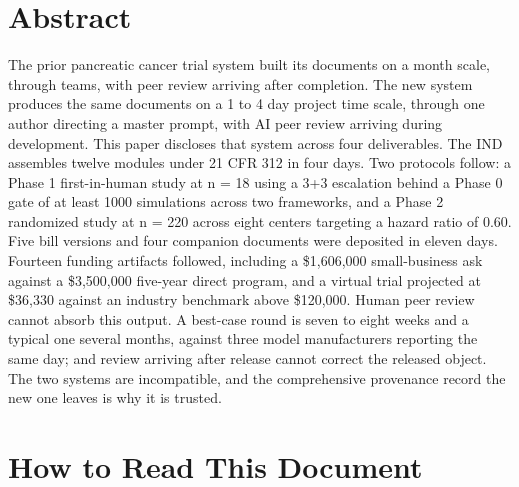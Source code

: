 \section*{Abstract}

The prior pancreatic cancer trial system built its documents on a month
scale, through teams, with peer review arriving after completion. The new
system produces the same documents on a 1 to 4 day project time scale, through
one author directing a master prompt, with AI peer review arriving during
development. This paper discloses that system across four deliverables. The IND
assembles twelve modules under 21 CFR 312 in four days. Two protocols follow: a
Phase 1 first-in-human study at n = 18 using a 3+3 escalation behind a Phase 0
gate of at least 1000 simulations across two frameworks, and a Phase 2
randomized study at n = 220 across eight centers targeting a hazard ratio of
0.60. Five bill versions and four companion documents were deposited in eleven
days. Fourteen funding artifacts followed, including a \$1,606,000
small-business ask against a \$3,500,000 five-year direct program, and a virtual
trial projected at \$36,330 against an industry benchmark above \$120,000.
Human peer review cannot absorb this output. A best-case round is seven to eight
weeks and a typical one several months, against three model manufacturers
reporting the same day; and review arriving after release cannot correct the
released object. The two systems are incompatible, and the comprehensive
provenance record the new one leaves is why it is trusted.


\section*{How to Read This Document}

